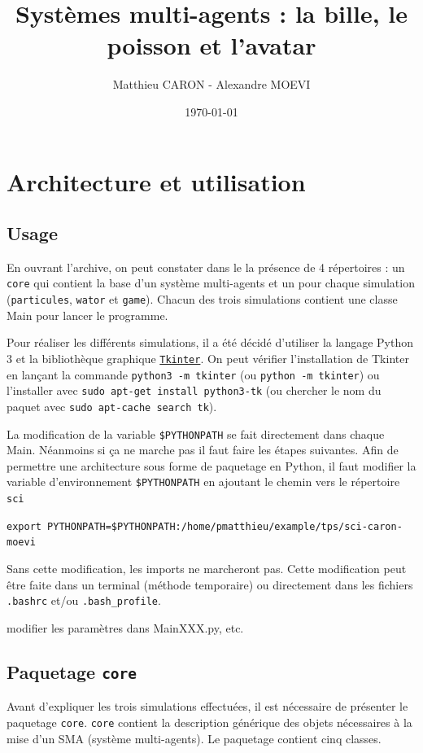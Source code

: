 \documentclass[a4paper]{article}
\title{Systèmes multi-agents : la bille, le poisson et l'avatar}
\author{Matthieu CARON - Alexandre MOEVI}
\date{\today}
\begin{document}
\maketitle

\section{Architecture et utilisation}

\subsection{Usage}

En ouvrant l'archive, on peut constater dans le la présence de 4 répertoires : un \texttt{core} qui contient la base d'un système multi-agents et un pour chaque simulation (\texttt{particules}, \texttt{wator} et \texttt{game}). Chacun des trois simulations contient une classe Main pour lancer le programme.

Pour réaliser les différents simulations, il a été décidé d'utiliser la langage Python 3 et la bibliothèque graphique \href{https://wiki.python.org/moin/TkInter}{\texttt{Tkinter}}. On peut vérifier l'installation de Tkinter en lançant la commande \texttt{python3 -m tkinter} (ou \texttt{python -m tkinter}) ou l'installer avec \texttt{sudo apt-get install python3-tk} (ou chercher le nom du paquet avec \texttt{sudo apt-cache search tk}).

\medskip
La modification de la variable \texttt{\$PYTHONPATH} se fait directement dans chaque Main. Néanmoins si ça ne marche pas il faut faire les étapes suivantes.
Afin de permettre une architecture sous forme de paquetage en Python, il faut modifier la variable d'environnement \texttt{\$PYTHONPATH} en ajoutant le chemin vers le répertoire \texttt{sci} 

\medskip
\texttt{export PYTHONPATH=\$PYTHONPATH:/home/pmatthieu/example/tps/sci-caron-moevi}

\medskip
Sans cette modification, les imports ne marcheront pas. Cette modification peut être faite dans un terminal (méthode temporaire) ou directement dans les fichiers \texttt{.bashrc} et/ou \texttt{.bash\_profile}.

\medskip
modifier les paramètres dans MainXXX.py, etc.

\subsection{Paquetage \texttt{core}}
Avant d'expliquer les trois simulations effectuées, il est nécessaire de présenter le paquetage \texttt{core}. \texttt{core} contient la description générique des objets nécessaires à la mise d'un SMA (système multi-agents). Le paquetage contient cinq classes.
 
\end{document}
